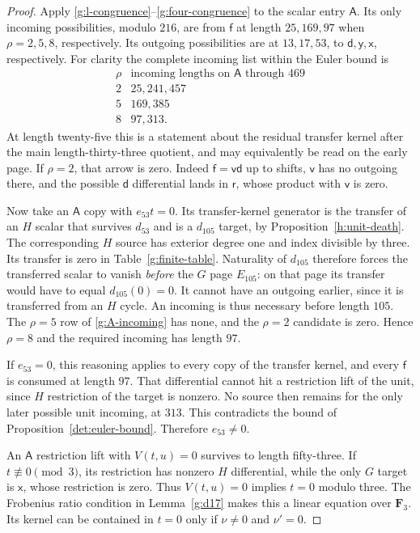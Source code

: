 \documentclass[11pt]{article}
\theoremstyle{definition}
\theoremstyle{remark}
\numberwithin{equation}{section}
\begin{document}
\begin{proof}
Apply \eqref{g:l-congruence}--\eqref{g:four-congruence}
to the scalar entry $\mathsf A$.  Its only incoming
possibilities, modulo $216$, are from $\mathsf f$ at
length $25,169,97$ when $\rho=2,5,8$, respectively.
Its outgoing possibilities are at $13,17,53$, to
$\mathsf d,\mathsf y,\mathsf x$, respectively.
For clarity the complete incoming list within the Euler
bound is
\begin{equation}\label{g:A-incoming}
\begin{array}{c|l}
 \rho&\text{incoming lengths on }\mathsf A\text{ through }469\\\hline
 2&25,241,457\\
 5&169,385\\
 8&97,313.
\end{array}
\end{equation}
At length twenty-five this is a statement about the
residual transfer kernel after the main length-thirty-three
quotient, and may equivalently be read on the early page.
If $\rho=2$, that arrow is zero.  Indeed
$\mathsf f=\mathsf v\mathsf d$ up to shifts,
$\mathsf v$ has no outgoing there, and the possible
$\mathsf d$ differential lands in $\mathsf r$,
whose product with $\mathsf v$ is zero.

Now take an $\mathsf A$ copy with $e_{53}t=0$.
Its transfer-kernel generator is the transfer of an
$H$ scalar that survives $d_{53}$ and is a
$d_{105}$ target, by Proposition~\ref{h:unit-death}.
The corresponding $H$ source has exterior degree one
and index divisible by three.  Its transfer is zero
in Table~\ref{g:finite-table}.  Naturality of $d_{105}$
therefore forces the transferred scalar to vanish
\emph{before} the $G$ page $E_{105}$: on that page its
transfer would have to equal $d_{105}(0)=0$.
It cannot have an outgoing earlier, since it is
transferred from an $H$ cycle.  An incoming is thus
necessary before length $105$.  The $\rho=5$ row of
\eqref{g:A-incoming} has none, and the $\rho=2$
candidate is zero.  Hence $\rho=8$ and the required
incoming has length $97$.

If $e_{53}=0$, this reasoning applies to every copy of
the transfer kernel, and every $\mathsf f$ is consumed
at length $97$.  That differential cannot hit a
restriction lift of the unit, since $H$ restriction of
the target is nonzero.  No source then remains for the
only later possible unit incoming, at $313$.
This contradicts the bound of Proposition~\ref{det:euler-bound}.
Therefore $e_{53}\ne0$.

An $\mathsf A$ restriction lift with $V(t,u)=0$
survives to length fifty-three.  If $t\not\equiv0\pmod3$,
its restriction has nonzero $H$ differential, while the
only $G$ target is $\mathsf x$, whose restriction is
zero.  Thus $V(t,u)=0$ implies $t=0$ modulo three.
The Frobenius ratio condition in Lemma~\ref{g:d17}
makes this a linear equation over $\mathbf F_3$.  Its kernel
can be contained in $t=0$ only if $\nu\ne0$ and
$\nu'=0$.
\end{proof}
\end{document}
